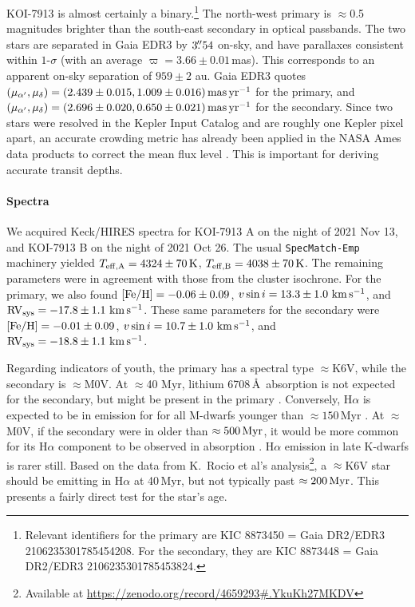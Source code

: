 \documentclass[12pt,twocolumn,linenumbers]{aastex63}
\newcommand{\mkms}{{\rm \,km\,s^{-1}}}  %
\begin{document}
KOI-7913 is almost certainly a binary.\footnote{Relevant identifiers for the
primary are KIC 8873450 = Gaia DR2/EDR3 2106235301785454208.  For the
secondary, they are KIC 8873448 = Gaia DR2/EDR3 2106235301785453824.}
The north-west primary is $\approx$0.5 magnitudes brighter than the
south-east secondary in optical passbands.  The two stars are
separated in Gaia EDR3 by $3\mbox{$.\!\!^{\prime\prime}$}54$ on-sky, and have parallaxes
consistent within $1$-$\sigma$ (with an average $\varpi=3.66 \pm
0.01$\,mas).  This corresponds to an apparent on-sky separation of
$959 \pm 2$ au.  Gaia EDR3 quotes
$(\mu_{\alpha'},\mu_\delta)=(2.439\pm0.015, 1.009\pm 0.016)\,{\rm
mas}\,{\rm yr}^{-1}$ for the primary, and
$(\mu_{\alpha'},\mu_\delta)=(2.696\pm0.020, 0.650 \pm 0.021) \,{\rm
mas}\,{\rm yr}^{-1}$ for the secondary.  Since two stars were resolved
in the Kepler Input Catalog and are roughly one Kepler pixel apart, an
accurate crowding metric has already been applied in the NASA Ames
data products to correct the mean flux level
\citep{2017ksci.rept....6M}.  This is important for deriving accurate
transit depths.

\paragraph{Spectra}

We acquired Keck/HIRES spectra for KOI-7913 A on the night of 2021 Nov
13, and KOI-7913 B on the night of 2021 Oct 26.  The usual
\texttt{SpecMatch-Emp} \citep{yee_SM_2017} machinery yielded $T_{\rm
eff,A} = 4324 \pm 70\,{\rm K}$, $T_{\rm eff,B} = 4038 \pm 70\,{\rm
K}$.  The remaining parameters were in agreement with those from the
cluster isochrone.  For the primary, we also found $[{\rm Fe/H}]=
-0.06 \pm 0.09$, $v\sin i = 13.3 \pm 1.0\,\mkms$, and ${\rm RV}_{\rm
sys} = -17.8 \pm 1.1\,\mkms$.  These same parameters for the secondary
were $[{\rm Fe/H}]= -0.01 \pm 0.09$, $v\sin i = 10.7 \pm 1.0\,\mkms$,
and ${\rm RV}_{\rm sys} = -18.8 \pm 1.1\,\mkms$.

Regarding indicators of youth, the primary has a spectral type
$\approx$K6V, while the secondary is $\approx$M0V.  At $\approx$40
Myr, lithium 6708\,\AA\ absorption is not expected for the secondary,
but might be present in the primary \citep[{\it
e.g.},][Figure~8]{soderblom_ages_2014}.  Conversely, H$\alpha$ is
expected to be in emission for for all M-dwarfs younger than
$\approx150$\,Myr \citep{kiman_calibration_2021}.  At $\approx$M0V, if
the secondary were in older than $\approx 500\,{\rm Myr}$, it would be
more common for its H$\alpha$ component to be observed in absorption
\citep[][Figure~4]{kiman_calibration_2021}.  H$\alpha$ emission in
late K-dwarfs is rarer still. Based on the data from K.~Rocio et al's
analysis\footnote{Available at
\url{https://zenodo.org/record/4659293\#.YkuKh27MKDV}}, a $\approx$K6V
star should be emitting in H$\alpha$ at 40\,Myr, but not typically
past $\approx200\,{\rm Myr}$.  This presents a fairly direct test for
the star's age.
\end{document}
